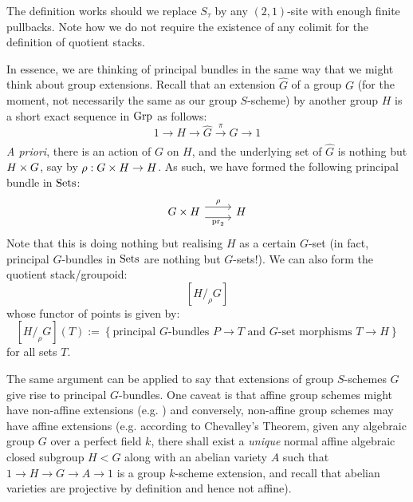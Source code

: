         \begin{remark}
            The definition works should we replace $S_{\tau}$ by any $(2, 1)$-site with enough finite pullbacks. Note how we do not require the existence of any colimit for the definition of quotient stacks. 
        \end{remark}
        \begin{example}
            In essence, we are thinking of principal bundles in the same way that we might think about group extensions. Recall that an extension $\hat{G}$ of a group $G$ (for the moment, not necessarily the same as our group $S$-scheme) by another group $H$ is a short exact sequence in $\mathrm{Grp}$ as follows:
                $$1 \to H \to \hat{G} \xrightarrow[]{\pi} G \to 1$$
            \textit{A priori}, there is an action of $G$ on $H$, and the underlying set of $\hat{G}$ is nothing but $H \x G$, say by $\rho: G \x H \to H$. As such, we have formed the following principal bundle in $\mathrm{Sets}$:
                $$
                    \begin{tikzcd}
                    {G \x H} & H
                    \arrow["\rho", shift left=2, from=1-1, to=1-2]
                    \arrow["{\pr_2}"', shift right=2, from=1-1, to=1-2]
                    \end{tikzcd}
                $$
            Note that this is doing nothing but realising $H$ as a certain $G$-set (in fact, principal $G$-bundles in $\mathrm{Sets}$ are nothing but $G$-sets!). We can also form the quotient stack/groupoid:
                $$[H /_{\rho} G]$$
            whose functor of points is given by:
                $$[H /_{\rho} G](T) := \left\{ \text{principal $G$-bundles $P \to T$ and $G$-set morphisms $T \to H$} \right\}$$
            for all sets $T$.

            The same argument can be applied to say that extensions of group $S$-schemes $G$ give rise to principal $G$-bundles. One caveat is that affine group schemes might have non-affine extensions (e.g. ) and conversely, non-affine group schemes may have affine extensions (e.g. according to Chevalley's Theorem, given any algebraic group $G$ over a perfect field $k$, there shall exist a \textit{unique} normal affine algebraic closed subgroup $H < G$ along with an abelian variety $A$ such that $1 \to H \to G \to A \to 1$ is a group $k$-scheme extension, and recall that abelian varieties are projective by definition and hence not affine).
        \end{example}
        
